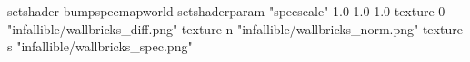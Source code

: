 setshader bumpspecmapworld
setshaderparam "specscale" 1.0 1.0 1.0
texture 0 "infallible/wallbricks_diff.png"
texture n "infallible/wallbricks_norm.png"
texture s "infallible/wallbricks_spec.png"